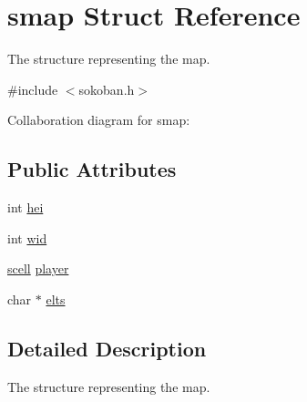 \hypertarget{structsmap}{\section{smap Struct Reference}
\label{structsmap}
}


The structure representing the map.  




{\ttfamily \#include $<$sokoban.\-h$>$}



Collaboration diagram for smap\-:
\subsection*{Public Attributes}
\begin{DoxyCompactItemize}
\item 
int \hyperlink{structsmap_aff5560dc909084c06a274c6dd717f475}{hei}
\item 
int \hyperlink{structsmap_aec8bed128626d11883c7661b6acc2af1}{wid}
\item 
\hyperlink{structscell}{scell} \hyperlink{structsmap_a854fbb51a1e657cd9500b3cc81d3607c}{player}
\item 
char $\ast$ \hyperlink{structsmap_af33eeab2c54ceb47a2998c0257e4b476}{elts}
\end{DoxyCompactItemize}


\subsection{Detailed Description}
The structure representing the map. 

